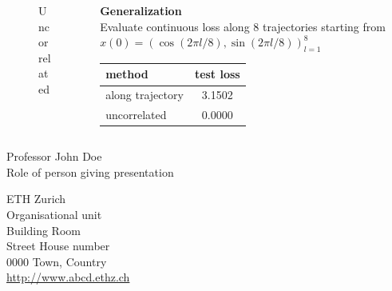\documentclass[11pt,aspectratio=169]{beamer}
\begin{document}
\begin{frame}
\begin{columns}
\begin{column}{0.3\textwidth}
\begin{figure}[h!]
                 \caption{Uncorrelated}
             \end{figure}
        \end{column}
        \begin{column}{0.4\textwidth}
        \textbf{}
        \textbf{Generalization}\\
        Evaluate continuous loss along 8 trajectories starting from
        $x(0)=(\cos(2\pi l/8), \sin(2\pi l/8))_{l=1}^8$
            \begin{center}
                \begin{tabular}{ l | c }
 method& test loss\\
 \hline
  along trajectory& 3.1502\\
  uncorrelated& 0.0000
\end{tabular}
            \end{center}
        \end{column}
    \end{columns}
\end{frame}


\begin{closingframe}

Professor John Doe\\
Role of person giving presentation\\

\medskip

ETH Zurich\\
Organisational unit\\
Building Room\\
Street House number\\
0000 Town, Country\\
\url{http://www.abcd.ethz.ch}

\end{closingframe}


\end{document}
